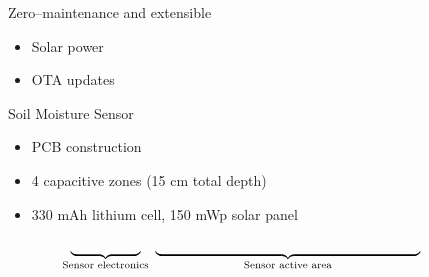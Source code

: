 \documentclass{beamer}
\begin{document}
\begin{frame}{Zero--maintenance and extensible}
\begin{itemize}
    \item Solar power
    \item OTA updates
\end{itemize}
\end{frame}


\begin{frame}{Soil Moisture Sensor}
\begin{itemize}
    \item PCB construction
    \item 4 capacitive zones (15 cm total depth)
    \item 330 mAh lithium cell, 150 mWp solar panel
\end{itemize}
\begin{figure}
    \centering
    
\end{figure}
$$\underbrace{\text{\hspace{5em}}}_{\text{Sensor electronics}}~\underbrace{\text{\hspace{19em}}}_{\text{Sensor active area}}\text{\hspace{2.5em}}$$
\end{frame}
\end{document}
